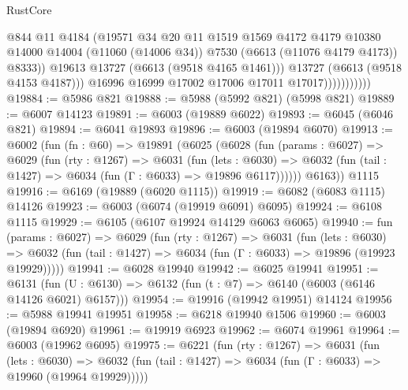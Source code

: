 \begin{lexlean}{RustCore}
\begin{coremodule}
                                @844
                                @11
                                @4184
                                (@19571
                                  @34
                                  @20
                                  @11
                                  @1519
                                  @1569
                                  @4172
                                  @4179
                                  @10380
                                  @14000
                                  @14004
                                  (@11060 (@14006 @34))
                                  @7530
                                  (@6613 (@11076 @4179 @4173))
                                  @8333))
                              @19613
                              @13727
                              (@6613 (@9518 @4165 @1461)))
                            @13727
                            (@6613 (@9518 @4153 @4187)))
                          @16996
                          @16999
                          @17002
                          @17006
                          @17011
                          @17017)))))))))))
@19884 := @5986 @821
@19888 := @5988 (@5992 @821) (@5998 @821)
@19889 := @6007 @14123
@19891 := @6003 (@19889 @6022)
@19893 := @6045 (@6046 @821)
@19894 := @6041 @19893
@19896 := @6003 (@19894 @6070)
@19913 := @6002
    (fun (fn : @60) =>
    @19891
      (@6025
        (@6028
          (fun (params : @6027) =>
          @6029
            (fun (rty : @1267) =>
            @6031
              (fun (lets : @6030) =>
              @6032 (fun (tail : @1427) => @6034 (fun (Γ : @6033) => @19896 @6117))))))
        @6163))
    @1115
@19916 := @6169 (@19889 (@6020 @1115))
@19919 := @6082 (@6083 @1115) @14126
@19923 := @6003 (@6074 (@19919 @6091) @6095)
@19924 := @6108 @1115
@19929 := @6105 (@6107 @19924 @14129 @6063 @6065)
@19940 := fun (params : @6027) =>
  @6029
    (fun (rty : @1267) =>
    @6031
      (fun (lets : @6030) =>
      @6032 (fun (tail : @1427) => @6034 (fun (Γ : @6033) => @19896 (@19923 @19929)))))
@19941 := @6028 @19940
@19942 := @6025 @19941
@19951 := @6131
    (fun (U : @6130) => @6132 (fun (t : @7) => @6140 (@6003 (@6146 @14126 @6021) @6157)))
@19954 := @19916 (@19942 @19951) @14124
@19956 := @5988 @19941 @19951
@19958 := @6218 @19940 @1506
@19960 := @6003 (@19894 @6920)
@19961 := @19919 @6923
@19962 := @6074 @19961
@19964 := @6003 (@19962 @6095)
@19975 := @6221
    (fun (rty : @1267) =>
    @6031
      (fun (lets : @6030) =>
      @6032 (fun (tail : @1427) => @6034 (fun (Γ : @6033) => @19960 (@19964 @19929)))))

\end{coremodule}
\end{lexlean}

